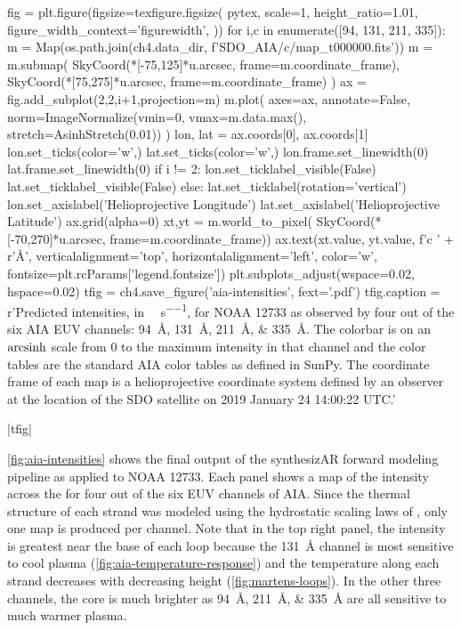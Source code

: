\begin{pycode}[chapter4]
fig = plt.figure(figsize=texfigure.figsize(
    pytex,
    scale=1,
    height_ratio=1.01,
    figure_width_context='figurewidth',
))
for i,c in enumerate([94, 131, 211, 335]):
    m = Map(os.path.join(ch4.data_dir, f'SDO_AIA/{c}/map_t000000.fits'))
    m = m.submap(
        SkyCoord(*[-75,125]*u.arcsec, frame=m.coordinate_frame),
        SkyCoord(*[75,275]*u.arcsec, frame=m.coordinate_frame)
    )
    ax = fig.add_subplot(2,2,i+1,projection=m)
    m.plot(
        axes=ax,
        annotate=False,
        norm=ImageNormalize(vmin=0, vmax=m.data.max(),
                            stretch=AsinhStretch(0.01))
    )
    lon, lat = ax.coords[0], ax.coords[1]
    lon.set_ticks(color='w',)
    lat.set_ticks(color='w',)
    lon.frame.set_linewidth(0)
    lat.frame.set_linewidth(0)
    if i != 2:
        lon.set_ticklabel_visible(False)
        lat.set_ticklabel_visible(False)
    else:
        lat.set_ticklabel(rotation='vertical')
        lon.set_axislabel('Helioprojective Longitude')
        lat.set_axislabel('Helioprojective Latitude')
    ax.grid(alpha=0)
    xt,yt = m.world_to_pixel(
        SkyCoord(*[-70,270]*u.arcsec, frame=m.coordinate_frame))
    ax.text(xt.value, yt.value, f'{c} ' + r'\si{\angstrom}', 
            verticalalignment='top', horizontalalignment='left', color='w',
            fontsize=plt.rcParams['legend.fontsize'])
plt.subplots_adjust(wspace=0.02, hspace=0.02)
tfig = ch4.save_figure('aia-intensities', fext='.pdf')
tfig.caption = r'Predicted intensities, in \si{\dn\per\pixel\per\second}, for \AR{} NOAA 12733 as observed by four out of the six AIA EUV channels: \SIlist{94;131;211;335}{\angstrom}. The colorbar is on an $\operatorname{arcsinh}$ scale from 0 to the maximum intensity in that channel and the color tables are the standard AIA color tables as defined in SunPy. The coordinate frame of each map is a helioprojective coordinate system defined by an observer at the location of the SDO satellite on 2019 January 24 14:00:22 UTC.'
\end{pycode}
\py[chapter4]|tfig|

\autoref{fig:aia-intensities} shows the final output of the synthesizAR forward modeling pipeline as applied to NOAA 12733. Each panel shows a map of the intensity across the \AR{} for four out of the six EUV channels of AIA. Since the thermal structure of each strand was modeled using the hydrostatic scaling laws of \citet{martens_scaling_2010}, only one map is produced per channel. Note that in the top right panel, the intensity is greatest near the base of each loop because the \SI{131}{\angstrom} channel is most sensitive to cool plasma (\autoref{fig:aia-temperature-response}) and the temperature along each strand decreases with decreasing height (\autoref{fig:martens-loops}). In the other three channels, the core is much brighter as \SIlist{94;211;335}{\angstrom} are all sensitive to much warmer plasma.


